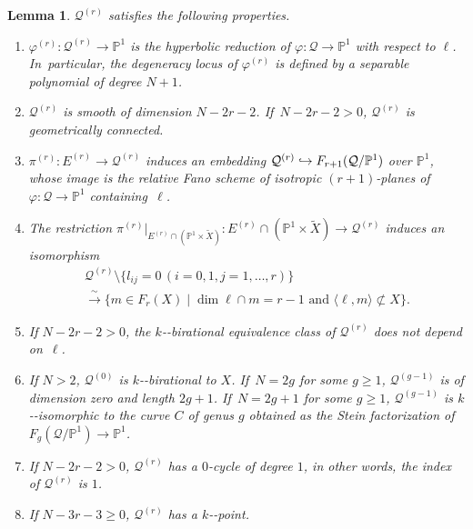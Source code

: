 \documentclass[10pt,a4paper]{amsart}
\providecommand{\nobreakdash}{\nobreak\hbox{-}}
\newcommand\hto{\mathrel{\lhook\joinrel\to}}
\theoremstyle{plain}
\newtheorem{lem}[thm]{Lemma}
\theoremstyle{definition}
\let\phi\varphi
\renewcommand\P{\mathbb{P}}
\begin{document}
\begin{lem}\label{lem:hyperbolic-reduction}
$\mathcal{Q}^{(r)}$ satisfies the following properties.
\begin{enumerate}
\item\label{item:hyperbolic-reduction-pencil} $\phi^{(r)}\colon\mathcal{Q}^{(r)}\to \P^1$
is the hyperbolic reduction of $\phi\colon \mathcal{Q}\to \P^1$ with respect to $\ell$. In~particular, the degeneracy locus of $\phi^{(r)}$ is defined by a separable polynomial of degree $N+1$.
\item\label{item:hyperbolic-reduction-smooth} $\mathcal{Q}^{(r)}$ is smooth of dimension $N-2r-2$. If~$N-2r-2>0$, $\mathcal{Q}^{(r)}$ is geometrically connected.
\item\label{item:hyperbolic-reduction-embedding} $\pi^{(r)}\colon E^{(r)}\to \mathcal{Q}^{(r)}$ induces an embedding $\mathcal{Q}^{(r)}\hto F_{r+1}(\mathcal{Q}/\P^1)$ over $\P^1$,
whose image is the relative Fano
scheme of isotropic $(r+1)$-planes
of
$\phi\colon \mathcal{Q}\to \P^1$
containing~$\ell$.
\item\label{item:hyperbolic-reduction-image}
The restriction
$\pi^{(r)}|_{E^{(r)}\cap (\P^1\times \widetilde{X})}\colon E^{(r)}\cap (\P^1\times \widetilde{X})\to \mathcal{Q}^{(r)}$ induces an isomorphism\vspace*{-5pt}
\begin{multline*}
\mathcal{Q}^{(r)}\setminus\bigl\{l_{ij} = 0 \, (i= 0,1, j=1,\dots, r)\bigr\}\\
\xrightarrow{\,\sim\,} \bigl\{m\in F_r(X)\mid \dim \ell\cap m = r-1 \text{ and }\langle \ell,m\rangle \not\subset X\bigr\}.
\end{multline*}
\item\label{item:hyperbolic-reduction-independence}
If $N\!-\!2r\!-\!2\!>\!0$, the $k$\nobreakdash-birational equivalence class of $\mathcal{Q}^{(r)}$
does not depend on~$\ell$.
\item\label{item:hyperbolic-reduction-max-min} If $N>2$, $\mathcal{Q}^{(0)}$ is $k$\nobreakdash-birational to $X$. If~$N=2g$ for some $g\geq 1$, $\mathcal{Q}^{(g-1)}$ is of dimension zero and length $2g+1$. If~$N=2g+1$ for some $g\geq 1$, $\mathcal{Q}^{(g-1)}$ is $k$\nobreakdash-isomorphic to the curve $C$ of genus $g$ obtained as the Stein factorization of $F_{g}(\mathcal{Q}/\P^1)\to \P^1$.
\item\label{item:index}
If $N-2r-2>0$, $\mathcal{Q}^{(r)}$ has a $0$-cycle of degree $1$,
in other words, the index of $\mathcal{Q}^{(r)}$ is $1$.
\item\label{item:rationalpoint}
If $N-3r-3\geq 0$, $\mathcal{Q}^{(r)}$ has a $k$\nobreakdash-point.
\end{enumerate}
\end{lem}
\end{document}
